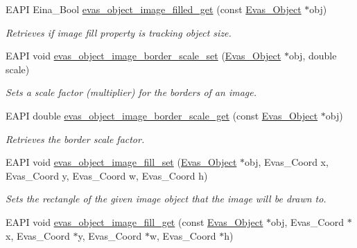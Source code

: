 \begin{DoxyCompactItemize}
EAPI Eina\_\-Bool \hyperlink{group__Evas__Object__Image_ga3fbe9f33ccc93a5c45ffa3b26019694e}{evas\_\-object\_\-image\_\-filled\_\-get} (const \hyperlink{group__Evas__Object__Group_ga9e19e6dd1f517a0ba437c0114d3e7c97}{Evas\_\-Object} $\ast$obj)
\begin{DoxyCompactList}\small\item\em Retrieves if image fill property is tracking object size. \item\end{DoxyCompactList}\item 
EAPI void \hyperlink{group__Evas__Object__Image_gaba00498563648d2d3934e7e75449abd0}{evas\_\-object\_\-image\_\-border\_\-scale\_\-set} (\hyperlink{group__Evas__Object__Group_ga9e19e6dd1f517a0ba437c0114d3e7c97}{Evas\_\-Object} $\ast$obj, double scale)
\begin{DoxyCompactList}\small\item\em Sets a scale factor (multiplier) for the borders of an image. \item\end{DoxyCompactList}\item 
EAPI double \hyperlink{group__Evas__Object__Image_ga7cc1bf948a8a5d61c703211f0bd5d2dc}{evas\_\-object\_\-image\_\-border\_\-scale\_\-get} (const \hyperlink{group__Evas__Object__Group_ga9e19e6dd1f517a0ba437c0114d3e7c97}{Evas\_\-Object} $\ast$obj)
\begin{DoxyCompactList}\small\item\em Retrieves the border scale factor. \item\end{DoxyCompactList}\item 
EAPI void \hyperlink{group__Evas__Object__Image_ga7182040bc16e68d3bbce3bd0f8ee8034}{evas\_\-object\_\-image\_\-fill\_\-set} (\hyperlink{group__Evas__Object__Group_ga9e19e6dd1f517a0ba437c0114d3e7c97}{Evas\_\-Object} $\ast$obj, Evas\_\-Coord x, Evas\_\-Coord y, Evas\_\-Coord w, Evas\_\-Coord h)
\begin{DoxyCompactList}\small\item\em Sets the rectangle of the given image object that the image will be drawn to. \item\end{DoxyCompactList}\item 
EAPI void \hyperlink{group__Evas__Object__Image_gaf1a7d6b8cf914234abdd5d3d3312f85e}{evas\_\-object\_\-image\_\-fill\_\-get} (const \hyperlink{group__Evas__Object__Group_ga9e19e6dd1f517a0ba437c0114d3e7c97}{Evas\_\-Object} $\ast$obj, Evas\_\-Coord $\ast$x, Evas\_\-Coord $\ast$y, Evas\_\-Coord $\ast$w, Evas\_\-Coord $\ast$h)

\end{DoxyCompactItemize}
